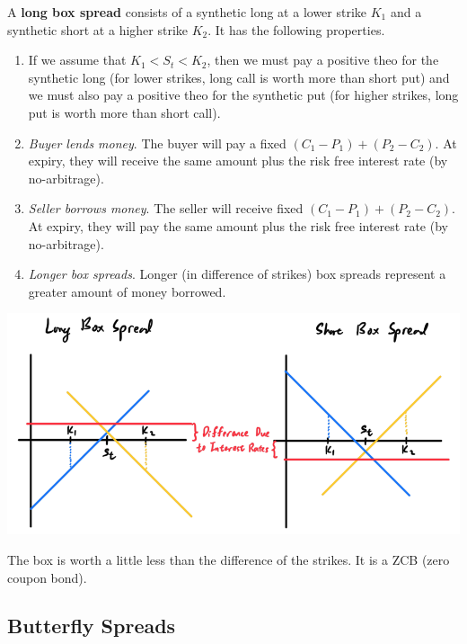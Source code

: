 \documentclass{article}
\begin{document}
    \begin{definition}
      A \textbf{long box spread} consists of a synthetic long at a lower strike $K_1$ and a synthetic short at a higher strike $K_2$. It has the following properties. 
      \begin{enumerate}
        \item If we assume that $K_1 < S_t < K_2$, then we must pay a positive theo for the synthetic long (for lower strikes, long call is worth more than short put) and we must also pay a positive theo for the synthetic put (for higher strikes, long put is worth more than short call). 
        \item \textit{Buyer lends money}. The buyer will pay a fixed $(C_1 - P_1) + (P_2 - C_2)$. At expiry, they will receive the same amount plus the risk free interest rate (by no-arbitrage). 
        \item \textit{Seller borrows money}. The seller will receive fixed $(C_1 - P_1) + (P_2 - C_2)$. At expiry, they will pay the same amount plus the risk free interest rate (by no-arbitrage). 
        \item \textit{Longer box spreads}. Longer (in difference of strikes) box spreads represent a greater amount of money borrowed. 
      \end{enumerate}
      \begin{center}
        \includegraphics[scale=0.3]{img/box_spread.png}
      \end{center}
      The box is worth a little less than the difference of the strikes. It is a ZCB (zero coupon bond).
    \end{definition}

  \subsection{Butterfly Spreads}
\end{document}
